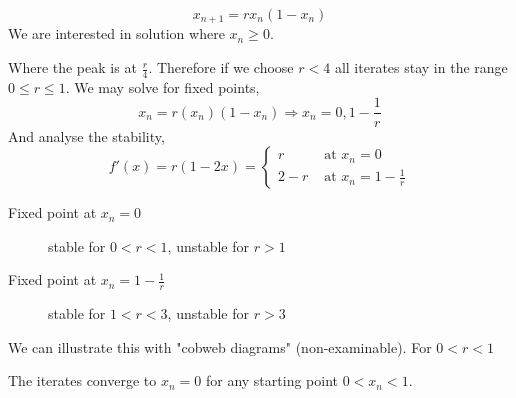 \documentclass{article}
\begin{document}
\begin{eg}
    \[
        x_{n+1} = r x_n (1 - x_n)    
    \]
    We are interested in solution where $x_n \geq 0$.
    \begin{center}
    \end{center}
    Where the peak is at $\frac{r}{4}$. Therefore if we choose $r < 4$ all iterates stay in the range $0 \leq r \leq 1$.
    We may solve for fixed points, 
    \[
        x_n = r(x_n)(1 - x_n) \Rightarrow x_n = 0, 1 - \frac{1}{r}
    \]
    And analyse the stability,
    \[
        f'(x) = r(1 - 2x) = \begin{cases}
            r & \text{ at } x_n = 0 \\
            2 - r & \text{ at } x_n = 1 - \frac{1}{r}
        \end{cases}
    \]
    \begin{description}
        \item[Fixed point at $x_n = 0$] stable for $0 < r < 1$, unstable for $r > 1$
        \item[Fixed point at $x_n = 1 - \frac{1}{r}$] stable for $1 < r < 3$, unstable for $r > 3$
    \end{description}

    We can illustrate this with "cobweb diagrams" (non-examinable).
    For $0 < r < 1$
    \begin{center}
    \end{center}
    The iterates converge to $x_n = 0$ for any starting point $0 < x_n < 1$.


\end{eg}
\end{document}
